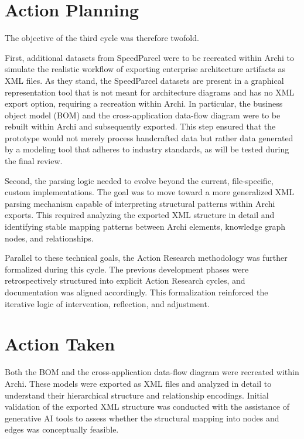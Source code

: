 \section{Action Planning}
\label{sec:cycle3_planning}
The objective of the third cycle was therefore twofold.

First, additional datasets from SpeedParcel were to be recreated within Archi to simulate the realistic workflow of exporting enterprise architecture artifacts as XML files. As they stand, the SpeedParcel datasets are present in a graphical representation tool that is not meant for architecture diagrams and has no XML export option, requiring a recreation within Archi. In particular, the business object model (BOM) and the cross-application data-flow diagram were to be rebuilt within Archi and subsequently exported. This step ensured that the prototype would not merely process handcrafted data but rather data generated by a modeling tool that adheres to industry standards, as will be tested during the final review.

Second, the parsing logic needed to evolve beyond the current, file-specific, custom implementations. The goal was to move toward a more generalized XML parsing mechanism capable of interpreting structural patterns within Archi exports. This required analyzing the exported  XML structure in detail and identifying stable mapping patterns between Archi elements, knowledge graph nodes, and relationships.

Parallel to these technical goals, the Action Research methodology was further formalized during this cycle. The previous development phases were retrospectively structured into explicit Action Research cycles, and documentation was aligned accordingly. This formalization reinforced the iterative logic of intervention, reflection, and adjustment.

\section{Action Taken}
\label{sec:cycle3_actionTaken}
Both the BOM and the cross-application data-flow diagram were recreated within Archi. These models were exported as XML files and analyzed in detail to understand their hierarchical structure and relationship encodings. Initial validation of the exported XML structure was conducted with the assistance of generative AI tools to assess whether the structural mapping into nodes and edges was conceptually feasible.

